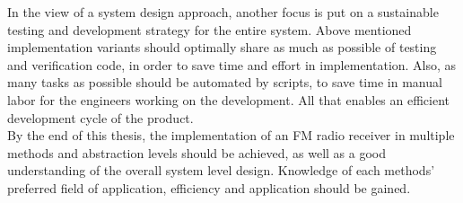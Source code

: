 In the view of a system design approach, another focus is put on a sustainable testing and development strategy for the entire system.
Above mentioned implementation variants should optimally share as much as possible of testing and verification code, in order to save time and effort in implementation.
Also, as many tasks as possible should be automated by scripts, to save time in manual labor for the engineers working on the development.
All that enables an efficient development cycle of the product.\\

By the end of this thesis, the implementation of an FM radio receiver in multiple methods and abstraction levels should be achieved, as well as a good understanding of the overall system level design.
Knowledge of each methods' preferred field of application, efficiency and application should be gained.


%
%
%
